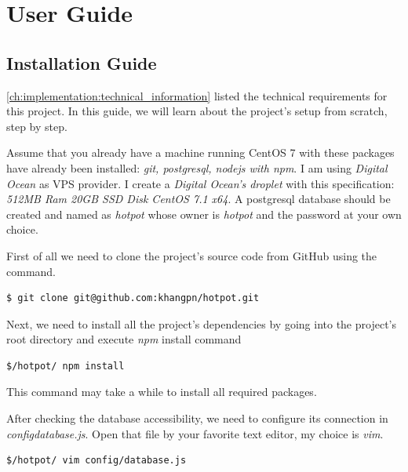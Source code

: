 
\chapter{User Guide}
\label{ch:appendix-a}


\section{Installation Guide}
\label{ch:appendix-a:installation_guide}

\autoref{ch:implementation:technical_information} listed the technical requirements for this project.
In this guide, we will learn about the project's setup from scratch, step by step.

Assume that you already have a machine running CentOS 7 with these packages have already been installed: \emph{git, postgresql, nodejs with npm}.
I am using \emph{Digital Ocean} as VPS provider.
I create a \emph{Digital Ocean's droplet} with this specification: \emph{512MB Ram 20GB SSD Disk CentOS 7.1 x64}.
A postgresql database should be created and named as \emph{hotpot} whose owner is \emph{hotpot} and the password at your own choice.

First of all we need to clone the project's source code from GitHub using the command.
\begin{lstlisting}[breaklines=false,frame=lt]
$ git clone git@github.com:khangpn/hotpot.git
\end{lstlisting}

Next, we need to install all the project's dependencies by going into the project's root directory and execute \emph{npm} install command
\begin{lstlisting}[breaklines=false,frame=lt]
$/hotpot/ npm install
\end{lstlisting}
This command may take a while to install all required packages.

After checking the database accessibility, we need to configure its connection in \emph{config\/database.js}. 
Open that file by your favorite text editor, my choice is \emph{vim}. 
\begin{lstlisting}[breaklines=false,frame=lt]
$/hotpot/ vim config/database.js
\end{lstlisting}


